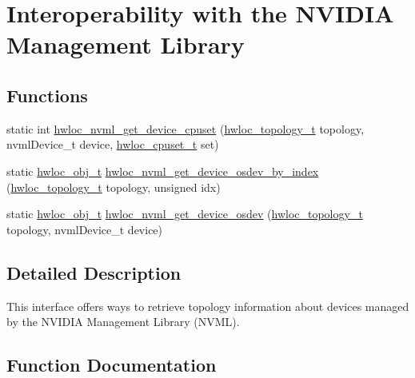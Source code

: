 \hypertarget{a00221}{}\section{Interoperability with the N\+V\+I\+D\+IA Management Library}
\label{a00221}
\subsection*{Functions}
\begin{DoxyCompactItemize}
\item 
static int \hyperlink{a00221_ga26cf0036d09ec4d7cb692380fac9659d}{hwloc\+\_\+nvml\+\_\+get\+\_\+device\+\_\+cpuset} (\hyperlink{a00186_ga9d1e76ee15a7dee158b786c30b6a6e38}{hwloc\+\_\+topology\+\_\+t} topology, nvml\+Device\+\_\+t device, \hyperlink{a00183_ga4bbf39b68b6f568fb92739e7c0ea7801}{hwloc\+\_\+cpuset\+\_\+t} set)
\item 
static \hyperlink{a00185_ga79b8ab56877ef99ac59b833203391c7d}{hwloc\+\_\+obj\+\_\+t} \hyperlink{a00221_gacd50fd0e2766ee05bc13234b46714756}{hwloc\+\_\+nvml\+\_\+get\+\_\+device\+\_\+osdev\+\_\+by\+\_\+index} (\hyperlink{a00186_ga9d1e76ee15a7dee158b786c30b6a6e38}{hwloc\+\_\+topology\+\_\+t} topology, unsigned idx)
\item 
static \hyperlink{a00185_ga79b8ab56877ef99ac59b833203391c7d}{hwloc\+\_\+obj\+\_\+t} \hyperlink{a00221_gaf176159b5760a191871eff23f5a69ee9}{hwloc\+\_\+nvml\+\_\+get\+\_\+device\+\_\+osdev} (\hyperlink{a00186_ga9d1e76ee15a7dee158b786c30b6a6e38}{hwloc\+\_\+topology\+\_\+t} topology, nvml\+Device\+\_\+t device)
\end{DoxyCompactItemize}


\subsection{Detailed Description}
This interface offers ways to retrieve topology information about devices managed by the N\+V\+I\+D\+IA Management Library (N\+V\+ML). 

\subsection{Function Documentation}
\mbox{\label{a00221_ga26cf0036d09ec4d7cb692380fac9659d}} 
